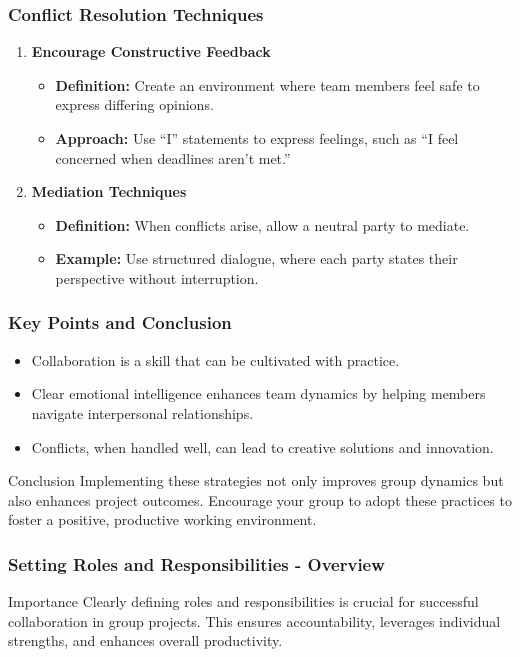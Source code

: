 \documentclass[aspectratio=169]{beamer}
\begin{document}
\begin{frame}[fragile]
    \frametitle{Conflict Resolution Techniques}
    \begin{enumerate}
        \item \textbf{Encourage Constructive Feedback}
        \begin{itemize}
            \item \textbf{Definition:} Create an environment where team members feel safe to express differing opinions.
            \item \textbf{Approach:} Use “I” statements to express feelings, such as “I feel concerned when deadlines aren’t met.”
        \end{itemize}
        
        \item \textbf{Mediation Techniques}
        \begin{itemize}
            \item \textbf{Definition:} When conflicts arise, allow a neutral party to mediate.
            \item \textbf{Example:} Use structured dialogue, where each party states their perspective without interruption.
        \end{itemize}
    \end{enumerate}
\end{frame}

\begin{frame}[fragile]
    \frametitle{Key Points and Conclusion}
    \begin{itemize}
        \item Collaboration is a skill that can be cultivated with practice.
        \item Clear emotional intelligence enhances team dynamics by helping members navigate interpersonal relationships.
        \item Conflicts, when handled well, can lead to creative solutions and innovation.
    \end{itemize}
    
    \begin{block}{Conclusion}
        Implementing these strategies not only improves group dynamics but also enhances project outcomes. Encourage your group to adopt these practices to foster a positive, productive working environment.
    \end{block}
\end{frame}

\begin{frame}[fragile]
    \frametitle{Setting Roles and Responsibilities - Overview}
    \begin{block}{Importance}
        Clearly defining roles and responsibilities is crucial for successful collaboration in group projects. This ensures accountability, leverages individual strengths, and enhances overall productivity.
    \end{block}
\end{frame}
\end{document}

